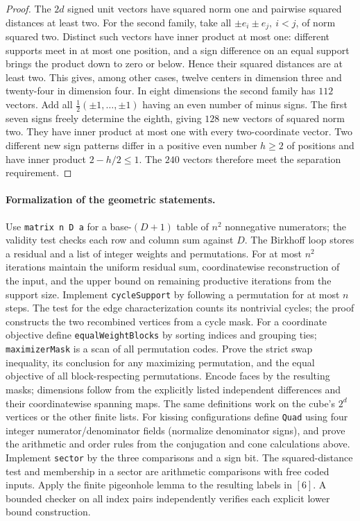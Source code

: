 \begin{proof}
The \(2d\) signed unit vectors have squared norm one and pairwise
squared distances at least two. For the second family, take all
\(\pm e_i\pm e_j,\ i<j\), of norm squared two. Distinct such vectors
have inner product at most one: different supports meet in at most one
position, and a sign difference on an equal support brings the product
down to zero or below. Hence their squared distances are at least two.
This gives, among other cases, twelve centers in dimension three and
twenty-four in dimension four. In eight dimensions the second family
has \(112\) vectors. Add all \(\frac12(\pm1,\ldots,\pm1)\) having an
even number of minus signs. The first seven signs freely determine the
eighth, giving \(128\) new vectors of squared norm two. They have
inner product at most one with every two-coordinate vector. Two
different new sign patterns differ in a positive even number \(h\ge2\)
of positions and have inner product \(2-h/2\le1\). The \(240\) vectors
therefore meet the separation requirement.
\end{proof}

\paragraph{Formalization of the geometric statements.}
Use \texttt{matrix n D a} for a base-\((D+1)\) table of \(n^2\)
nonnegative numerators; the validity test checks each row and column
sum against \(D\). The Birkhoff loop stores a residual and a list of
integer weights and permutations. For at most \(n^2\) iterations maintain
the uniform residual sum, coordinatewise reconstruction of the input,
and the upper bound on remaining productive iterations from the support
size. Implement \texttt{cycleSupport} by following a permutation for
at most \(n\) steps. The test for the edge characterization counts its
nontrivial cycles; the proof constructs the two recombined vertices
from a cycle mask. For a coordinate objective define
\texttt{equalWeightBlocks} by sorting indices and grouping ties;
\texttt{maximizerMask} is a scan of all permutation codes. Prove the
strict swap inequality, its conclusion for any maximizing permutation,
and the equal objective of all block-respecting permutations. Encode
faces by the resulting masks; dimensions follow from the explicitly
listed independent differences and their coordinatewise spanning maps.
The same definitions work on the cube's \(2^d\) vertices or the other
finite lists. For kissing configurations define \texttt{Quad} using four
integer numerator/denominator fields (normalize denominator signs), and
prove the arithmetic and order rules from the conjugation and cone
calculations above. Implement \texttt{sector} by the three comparisons
and a sign bit. The squared-distance test and membership in a sector
are arithmetic comparisons with free coded inputs. Apply the finite
pigeonhole lemma to the resulting labels in \([6]\). A bounded
checker on all index pairs independently verifies each explicit lower
bound construction.

